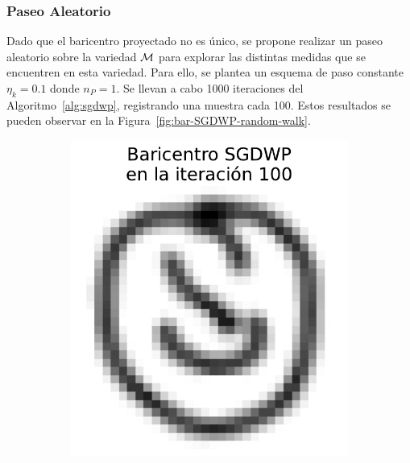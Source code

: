 \subsubsection{Paseo Aleatorio}\label{sssec:sgdwp-paseo-aleatorio}  %

Dado que el baricentro proyectado no es único, se propone realizar un paseo aleatorio sobre la variedad $\operatorname{\mathcal{M}}$ para explorar las distintas medidas que se encuentren en esta variedad. Para ello, se plantea un esquema de paso constante $\eta_k = 0.1 $ donde $n_P = 1$.
Se llevan a cabo 1000 iteraciones del Algoritmo~\ref*{alg:sgdwp}, registrando una muestra cada 100. Estos resultados se pueden observar en la Figura~\ref{fig:bar-SGDWP-random-walk}.

\begin{figure}[H]
    \centering
    \begin{subfigure}[b]{0.17\textwidth}
        \centering
        \includegraphics[width=\textwidth]{img/sgdwp-rw/bar-SGDWP-random-walk-iter-01.pdf}
        \label{fig:bar-SGDWP-random-walk-iter-01}
    \end{subfigure}
    \hfill
    \begin{subfigure}[b]{0.17\textwidth}

\end{subfigure}
\end{figure}
